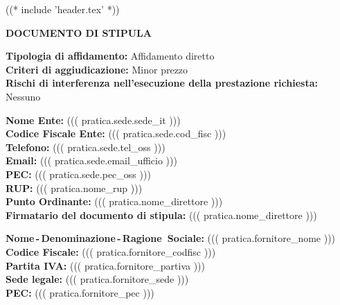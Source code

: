 
((* include 'header.tex' *))


\topaddr

\begin{center}
	\textbf{DOCUMENTO DI STIPULA}
\end{center}


\textbf{Tipologia di affidamento:} Affidamento diretto \\
\textbf{Criteri di aggiudicazione:} Minor prezzo \\
\textbf{Rischi di interferenza nell'esecuzione della prestazione richiesta:} Nessuno \\


\textbf{Nome Ente:} ((( pratica.sede.sede_it ))) \\
\textbf{Codice Fiscale Ente:} ((( pratica.sede.cod_fisc ))) \\
\textbf{Telefono:} ((( pratica.sede.tel_oss ))) \\
\textbf{Email:} ((( pratica.sede.email_ufficio ))) \\
\textbf{PEC:} ((( pratica.sede.pec_oss ))) \\
\textbf{RUP:} ((( pratica.nome_rup ))) \\
\textbf{Punto Ordinante:} ((( pratica.nome_direttore ))) \\
\textbf{Firmatario del documento di stipula:} ((( pratica.nome_direttore ))) \\


\textbf{Nome\,-\,Denominazione\,-\,Ragione~Sociale:} ((( pratica.fornitore_nome ))) \\
\textbf{Codice Fiscale:} ((( pratica.fornitore_codfisc ))) \\
\textbf{Partita IVA:} ((( pratica.fornitore_partiva ))) \\
\textbf{Sede legale:} ((( pratica.fornitore_sede ))) \\
\textbf{PEC:} ((( pratica.fornitore_pec ))) \\


